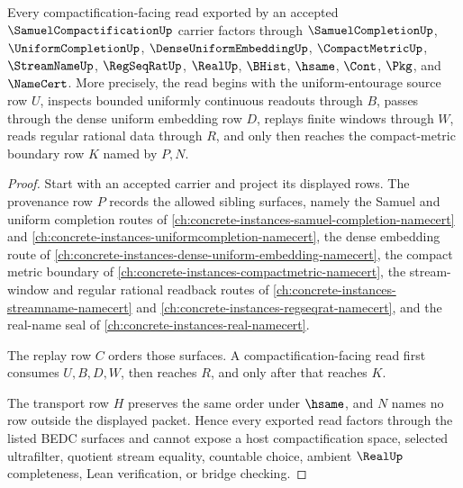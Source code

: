 \begin{theorem}
\label{thm:samuel-compactification-uniform-handoff}
Every compactification-facing read exported by an accepted $\SamuelCompactificationUp$ carrier factors through $\SamuelCompletionUp$, $\UniformCompletionUp$, $\DenseUniformEmbeddingUp$, $\CompactMetricUp$, $\StreamNameUp$, $\RegSeqRatUp$, $\RealUp$, $\BHist$, $\hsame$, $\Cont$, $\Pkg$, and $\NameCert$. More precisely, the read begins with the uniform-entourage source row $U$, inspects bounded uniformly continuous readouts through $B$, passes through the dense uniform embedding row $D$, replays finite windows through $W$, reads regular rational data through $R$, and only then reaches the compact-metric boundary row $K$ named by $P,N$.
\end{theorem}
\begin{proof}
Start with an accepted carrier and project its displayed rows. The provenance row $P$ records the allowed sibling surfaces, namely the Samuel and uniform completion routes of \autoref{ch:concrete-instances-samuel-completion-namecert} and \autoref{ch:concrete-instances-uniformcompletion-namecert}, the dense embedding route of \autoref{ch:concrete-instances-dense-uniform-embedding-namecert}, the compact metric boundary of \autoref{ch:concrete-instances-compactmetric-namecert}, the stream-window and regular rational readback routes of \autoref{ch:concrete-instances-streamname-namecert} and \autoref{ch:concrete-instances-regseqrat-namecert}, and the real-name seal of \autoref{ch:concrete-instances-real-namecert}.

The replay row $C$ orders those surfaces. A compactification-facing read first consumes $U,B,D,W$, then reaches $R$, and only after that reaches $K$.

The transport row $H$ preserves the same order under $\hsame$, and $N$ names no row outside the displayed packet. Hence every exported read factors through the listed BEDC surfaces and cannot expose a host compactification space, selected ultrafilter, quotient stream equality, countable choice, ambient $\RealUp$ completeness, Lean verification, or bridge checking.
\end{proof}

